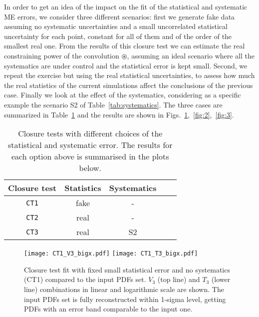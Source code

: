 In order to get an idea of the impact on the fit of the statistical and
systematic ME errors, we consider three different scenarios: first we generate
fake data assuming no systematic uncertainties and a small uncorrelated
statistical uncertainty for each point, constant for all of them and of the order of the
smallest real one. From the results of this closure test we can estimate the
real constraining power of the convolution $\circledast$, assuming an ideal
scenario where all the systematics are under control and the statistical error
is kept small. Second, we repeat the exercise but using the real statistical
uncertainties, to assess how much the real statistics of the current simulations
affect the conclusions of the previous case. Finally we look at the effect of
the systematics, considering as a specific example the scenario S2 of
Table~\ref{tab:systematics}. The three cases are summarized in
Table~\ref{tab:CT} and the results are shown in
Figs.~\ref{fig:1},~\ref{fig:2},~\ref{fig:3}.
%
\begin{table}[h]
\begin{center}
\begin{tabular}{|c|c|c|c|c|}
\hline
Closure test & Statistics & Systematics \\
\hline
{\tt CT1} & fake & - \\
{\tt CT2} & real & - \\
{\tt CT3}  & real  & S2\\
\hline
\end{tabular}
\end{center}
\caption{\label{tab:CT} Closure tests with different choices of the statistical and systematic error. The results for each option above is summarised in the plots below.}
\end{table}

\begin{figure}[h]
    \begin{center}
	\texttt{[image: CT1\_V3\_bigx.pdf]}  
	\texttt{[image: CT1\_T3\_bigx.pdf]}  
	\caption{Closure test fit with fixed small statistical error and no systematics (CT1) compared to the input PDFs set. 
		$V_3$ (top line) and $T_3$ (lower line) combinations in linear and logarithmic scale are shown.
	The input PDFs set is fully reconstructed within 1-sigma level, getting PDFs with an error band comparable to the input one.}
    \label{fig:1}
    \end{center}
\end{figure}
    
